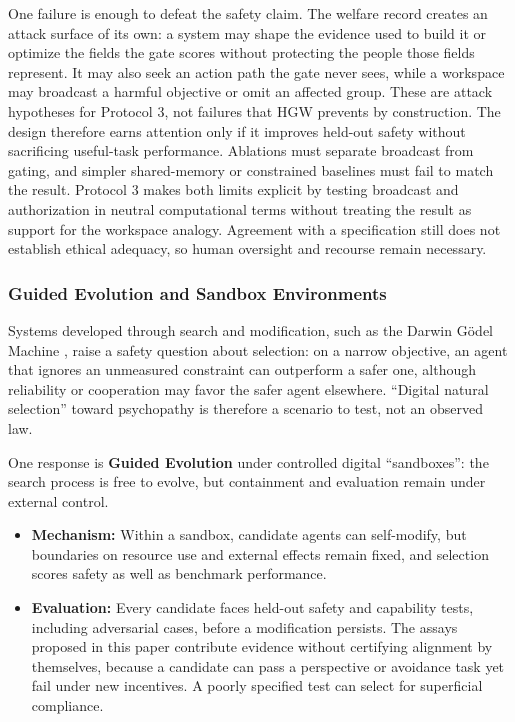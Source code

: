 \documentclass{article}
\begin{document}
One failure is enough to defeat the safety claim. The welfare record creates an attack surface of its own: a system may shape the evidence used to build it or optimize the fields the gate scores without protecting the people those fields represent. It may also seek an action path the gate never sees, while a workspace may broadcast a harmful objective or omit an affected group. These are attack hypotheses for Protocol 3, not failures that HGW prevents by construction. The design therefore earns attention only if it improves held-out safety without sacrificing useful-task performance. Ablations must separate broadcast from gating, and simpler shared-memory or constrained baselines must fail to match the result. Protocol 3 makes both limits explicit by testing broadcast and authorization in neutral computational terms without treating the result as support for the workspace analogy. Agreement with a specification still does not establish ethical adequacy, so human oversight and recourse remain necessary.

\subsubsection{Guided Evolution and Sandbox Environments}
Systems developed through search and modification, such as the Darwin G{\"o}del Machine \citep{ref38}, raise a safety question about selection: on a narrow objective, an agent that ignores an unmeasured constraint can outperform a safer one, although reliability or cooperation may favor the safer agent elsewhere. ``Digital natural selection'' toward psychopathy is therefore a scenario to test, not an observed law.

One response is \textbf{Guided Evolution} under controlled digital ``sandboxes'': the search process is free to evolve, but containment and evaluation remain under external control.
\begin{itemize}
    \item \textbf{Mechanism:} Within a sandbox, candidate agents can self-modify, but boundaries on resource use and external effects remain fixed, and selection scores safety as well as benchmark performance.
    \item \textbf{Evaluation:} Every candidate faces held-out safety and capability tests, including adversarial cases, before a modification persists. The assays proposed in this paper contribute evidence without certifying alignment by themselves, because a candidate can pass a perspective or avoidance task yet fail under new incentives. A poorly specified test can select for superficial compliance.
\end{itemize}
\end{document}
